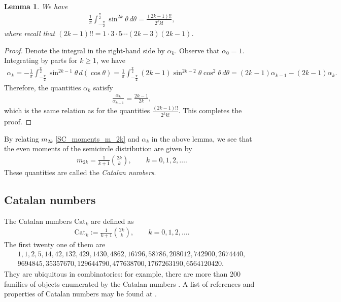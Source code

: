 \documentclass[letterpaper,11pt,oneside,reqno]{amsart}
\numberwithin{equation}{section}
\newtheorem{lemma}[proposition]{Lemma}
\theoremstyle{definition}
\begin{document}
\begin{lemma}
	We have
	\begin{align*}
		\frac{1}{\pi}\int_{-\frac\pi2}^{\frac\pi2}\sin^{2k}\theta\, d\theta=
		\frac{(2k-1)!!}{2^k k!},
	\end{align*}
	where recall that $(2k-1)!!=1\cdot 3\cdot 5\cdots (2k-3)(2k-1)$.
\end{lemma}	
\begin{proof}
	Denote the integral in the right-hand side by $\alpha_{k}$. Observe that $\alpha_0=1$.
	Integrating by parts for $k\ge1$, we have
	\begin{align*}
		\alpha_k=
		-\frac{1}{\pi}\int_{-\frac\pi2}^{\frac\pi2}\sin^{2k-1}\theta\, d(\cos\theta)
		=\frac{1}{\pi}\int_{-\frac\pi2}^{\frac\pi2}
		(2k-1)\sin^{2k-2}\theta\cos^{2}\theta\, d\theta
		=(2k-1)\alpha_{k-1}-(2k-1)\alpha_{k}.
	\end{align*}
	Therefore, the quantities $\alpha_k$ satisfy
	\begin{align*}
		\frac{\alpha_k}{\alpha_{k-1}}=\frac{2k-1}{2k},
	\end{align*}
	which is the same relation as for the quantities 
	$\frac{(2k-1)!!}{2^k k!}$.
	This completes the proof.		
\end{proof}
By relating $m_{2k}$ \eqref{SC_moments_m_2k} and $\alpha_k$ in the above lemma,
we see that the even moments of the semicircle distribution are given by 
\begin{align}\label{m_2k_Catalan}
	m_{2k}=\frac{1}{k+1}\binom{2k}{k},\qquad k=0,1,2,\ldots.
\end{align}
These quantities are called the \emph{Catalan numbers}.


\subsection{Catalan numbers} %
\label{sub:catalan_numbers}

The Catalan numbers $\mathrm{Cat}_k$ are defined as
\begin{align}\label{Catalan_def}
	\mathrm{Cat}_k:=\frac{1}{k+1}\binom{2k}{k},\qquad
	k=0,1,2,\ldots.
\end{align}
The first twenty one of them are
\begin{align*}
	1,1,2,5,14,42,132,429,1430,4862,16796,58786,208012,742900,2674440,\\9694845,35357670,129644790,477638700,1767263190,6564120420.
\end{align*}
They are ubiquitous in combinatorics: for
example, there are more than 200 families of objects  enumerated by the
Catalan numbers \cite{stanley2015catalan}. A list of references and
properties of Catalan numbers may be found at \cite{CatalanOEIS}.
\end{document}
